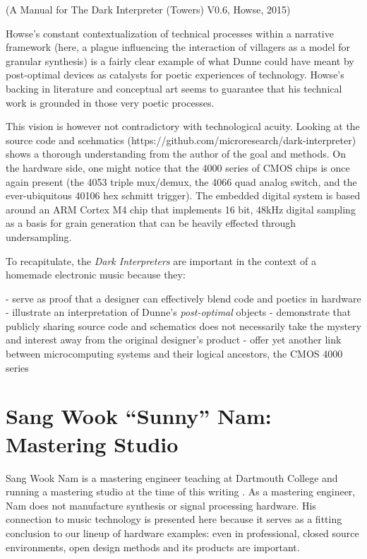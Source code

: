 (A Manual for The Dark Interpreter (Towers) V0.6, Howse, 2015)
	
Howse's constant contextualization of technical processes within a narrative framework (here, a plague influencing the interaction of villagers as a model for granular synthesis) is a fairly clear example of what Dunne could have meant by post-optimal devices as catalysts for poetic experiences of technology. Howse's backing in literature and conceptual art seems to guarantee that his technical work is grounded in those very poetic processes. 

This vision is however not contradictory with technological acuity. Looking at the source code and scehmatics (https://github.com/microresearch/dark-interpreter) shows a thorough understanding from the author of the goal and methods. On the hardware side, one might notice that the 4000 series of CMOS chips is once again present (the 4053 triple mux/demux, the 4066 quad analog switch, and the ever-ubiquitous 40106 hex schmitt trigger). The embedded digital system is based around an ARM Cortex M4 chip that implements 16 bit, 48kHz digital sampling as a basis for grain generation that can be heavily effected through undersampling. 


To recapitulate, the \emph{Dark Interpreters} are important in the context of a homemade electronic music because they: 

- serve as proof that a designer can effectively blend code and poetics in hardware 
- illustrate an interpretation of Dunne's \emph{post-optimal} objects
- demonstrate that publicly sharing source code and schematics does not necessarily take the mystery and interest away from the original designer's product
- offer yet another link between microcomputing systems and their logical ancestors, the CMOS 4000 series





\section{Sang Wook ``Sunny'' Nam: Mastering Studio}

Sang Wook Nam is a mastering engineer teaching at Dartmouth College and running a mastering studio at the time of this writing \citep{nam2015}. As a mastering engineer, Nam does not manufacture synthesis or signal processing hardware. His connection to music technology is presented here because it serves as a fitting conclusion to our lineup of hardware examples: even in professional, closed source environments, open design methods and its products are important. 

